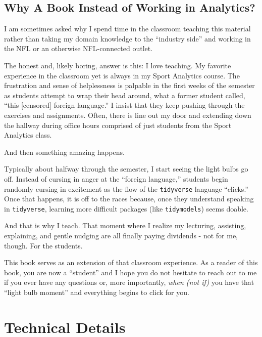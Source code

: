 \documentclass[
  letterpaper,
]{krantz}
\begin{document}
\hypertarget{why-a-book-instead-of-working-in-analytics}{%
\subsection{Why A Book Instead of Working in
Analytics?}\label{why-a-book-instead-of-working-in-analytics}}

I am sometimes asked why I spend time in the classroom teaching this
material rather than taking my domain knowledge to the ``industry side''
and working in the NFL or an otherwise NFL-connected outlet.

The honest and, likely boring, answer is this: I love teaching. My
favorite experience in the classroom yet is always in my Sport Analytics
course. The frustration and sense of helplessness is palpable in the
first weeks of the semester as students attempt to wrap their head
around, what a former student called, ``this {[}censored{]} foreign
language.'' I insist that they keep pushing through the exercises and
assignments. Often, there is line out my door and extending down the
hallway during office hours comprised of just students from the Sport
Analytics class.

And then something amazing happens.

Typically about halfway through the semester, I start seeing the light
bulbs go off. Instead of cursing in anger at the ``foreign language,''
students begin randomly cursing in excitement as the flow of the
\texttt{tidyverse} language ``clicks.'' Once that happens, it is off to
the races because, once they understand speaking in \texttt{tidyverse},
learning more difficult packages (like \texttt{tidymodels}) seems
doable.

And that is why I teach. That moment where I realize my lecturing,
assisting, explaining, and gentle nudging are all finally paying
dividends - not for me, though. For the students.

This book serves as an extension of that classroom experience. As a
reader of this book, you are now a ``student'' and I hope you do not
hesitate to reach out to me if you ever have any questions or, more
importantly, \emph{when (not if)} you have that ``light bulb moment''
and everything begins to click for you.

\hypertarget{technical-details}{%
\section*{Technical Details}\label{technical-details}}
\end{document}
